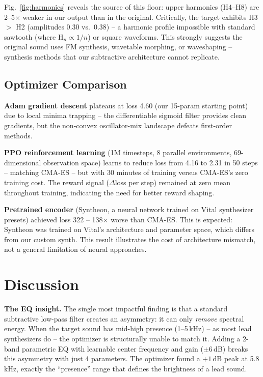 \documentclass[10pt,twocolumn]{article}
\begin{document}
Fig.~\ref{fig:harmonics} reveals the source of this floor: upper harmonics (H4--H8) are 2--5$\times$ weaker in our output than in the original. Critically, the target exhibits H3 $>$ H2 (amplitudes 0.30 vs.\ 0.38) -- a harmonic profile impossible with standard sawtooth (where $\text{H}_n \propto 1/n$) or square waveforms. This strongly suggests the original sound uses FM synthesis, wavetable morphing, or waveshaping -- synthesis methods that our subtractive architecture cannot replicate.

\subsection{Optimizer Comparison}

\textbf{Adam gradient descent} plateaus at loss 4.60 (our 15-param starting point) due to local minima trapping -- the differentiable sigmoid filter provides clean gradients, but the non-convex oscillator-mix landscape defeats first-order methods.

\textbf{PPO reinforcement learning} (1M timesteps, 8 parallel environments, 69-dimensional observation space) learns to reduce loss from 4.16 to 2.31 in 50 steps -- matching CMA-ES -- but with 30 minutes of training versus CMA-ES's zero training cost. The reward signal ($\Delta$loss per step) remained at zero mean throughout training, indicating the need for better reward shaping.

\textbf{Pretrained encoder} (Syntheon, a neural network trained on Vital synthesizer presets) achieved loss 322 -- 138$\times$ worse than CMA-ES. This is expected: Syntheon was trained on Vital's architecture and parameter space, which differs from our custom synth. This result illustrates the cost of architecture mismatch, not a general limitation of neural approaches.

\section{Discussion}

\textbf{The EQ insight.} The single most impactful finding is that a standard subtractive low-pass filter creates an asymmetry: it can only \emph{remove} spectral energy. When the target sound has mid-high presence (1--5\,kHz) -- as most lead synthesizers do -- the optimizer is structurally unable to match it. Adding a 2-band parametric EQ with learnable center frequency and gain ($\pm 6$\,dB) breaks this asymmetry with just 4 parameters. The optimizer found a $+1$\,dB peak at 5.8\,kHz, exactly the ``presence'' range that defines the brightness of a lead sound.
\end{document}
